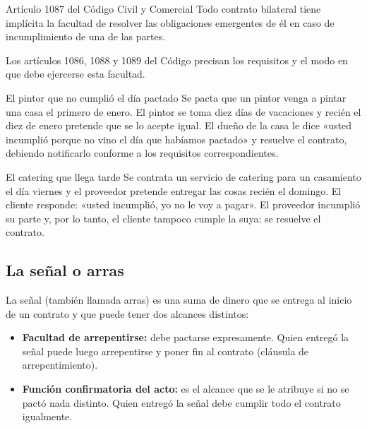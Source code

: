 \documentclass[12pt,oneside]{book}
\begin{document}
\begin{articulo}{Artículo 1087 del Código Civil y Comercial}
Todo contrato bilateral tiene implícita la facultad de resolver las obligaciones emergentes de él en caso de incumplimiento de una de las partes.
\end{articulo}

Los artículos 1086, 1088 y 1089 del Código precisan los requisitos y el modo en que debe ejercerse esta facultad.


\begin{example}{El pintor que no cumplió el día pactado}
Se pacta que un pintor venga a pintar una casa el primero de enero. El pintor se toma diez días de vacaciones y recién el diez de enero pretende que se lo acepte igual. El dueño de la casa le dice «usted incumplió porque no vino el día que habíamos pactado» y resuelve el contrato, debiendo notificarlo conforme a los requisitos correspondientes.
\end{example}

\begin{example}{El catering que llega tarde}
Se contrata un servicio de catering para un casamiento el día viernes y el proveedor pretende entregar las cosas recién el domingo. El cliente responde: «usted incumplió, yo no le voy a pagar». El proveedor incumplió su parte y, por lo tanto, el cliente tampoco cumple la suya: se resuelve el contrato.
\end{example}

\subsection{La señal o arras}

La señal (también llamada arras) es una suma de dinero que se entrega al inicio de un contrato y que puede tener dos alcances distintos:

\begin{itemize}
    \item \textbf{Facultad de arrepentirse:} debe pactarse expresamente. Quien entregó la señal puede luego arrepentirse y poner fin al contrato (cláusula de arrepentimiento).
    \item \textbf{Función confirmatoria del acto:} es el alcance que se le atribuye si no se pactó nada distinto. Quien entregó la señal debe cumplir todo el contrato igualmente.
\end{itemize}
\end{document}
